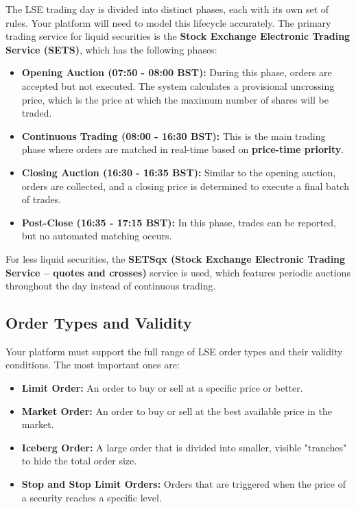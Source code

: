 \documentclass[12pt]{article}
\begin{document}
The LSE trading day is divided into distinct phases, each with its own set of rules. Your platform will need to model this lifecycle accurately. The primary trading service for liquid securities is the \textbf{Stock Exchange Electronic Trading Service (SETS)}, which has the following phases:

\begin{itemize}
    \item \textbf{Opening Auction (07:50 - 08:00 BST):} During this phase, orders are accepted but not executed. The system calculates a provisional uncrossing price, which is the price at which the maximum number of shares will be traded.
    \item \textbf{Continuous Trading (08:00 - 16:30 BST):} This is the main trading phase where orders are matched in real-time based on \textbf{price-time priority}.
    \item \textbf{Closing Auction (16:30 - 16:35 BST):} Similar to the opening auction, orders are collected, and a closing price is determined to execute a final batch of trades.
    \item \textbf{Post-Close (16:35 - 17:15 BST):} In this phase, trades can be reported, but no automated matching occurs.
\end{itemize}

For less liquid securities, the \textbf{SETSqx (Stock Exchange Electronic Trading Service – quotes and crosses)} service is used, which features periodic auctions throughout the day instead of continuous trading.

\subsection{Order Types and Validity}

Your platform must support the full range of LSE order types and their validity conditions. The most important ones are:

\begin{itemize}
    \item \textbf{Limit Order:} An order to buy or sell at a specific price or better.
    \item \textbf{Market Order:} An order to buy or sell at the best available price in the market.
    \item \textbf{Iceberg Order:} A large order that is divided into smaller, visible "tranches" to hide the total order size.
    \item \textbf{Stop and Stop Limit Orders:} Orders that are triggered when the price of a security reaches a specific level.
\end{itemize}
\end{document}
